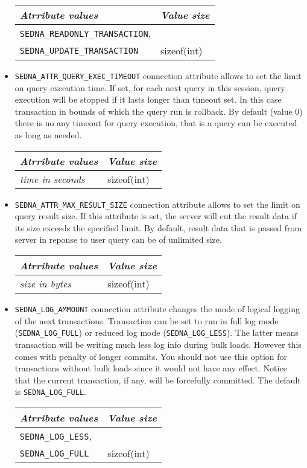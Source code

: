\documentclass[a4paper,12pt]{article}
\begin{document}
\begin{itemize}
\begin{tabular}{|l|l|}
\hline
\emph{Atrribute values} & \emph{Value size} \\
\hline
\verb!SEDNA_READONLY_TRANSACTION!, & \\ 
\verb!SEDNA_UPDATE_TRANSACTION! & sizeof(int) \\
\hline
\end{tabular}

\item\verb!SEDNA_ATTR_QUERY_EXEC_TIMEOUT! connection attribute allows to set the
limit on query execution time. If set, for each next query in this session,
query execution will be stopped if it lasts longer than timeout set. In this
case transaction in bounds of which the query run is rollback. By default (value
0) there is no any timeout for query execution, that is a query can be executed
as long as needed.

\begin{tabular}{|l|l|}
\hline
\emph{Atrribute values} & \emph{Value size} \\
\hline
\emph{time in seconds} & sizeof(int) \\
\hline
\end{tabular}

\item\verb!SEDNA_ATTR_MAX_RESULT_SIZE! connection attribute allows to set the
limit on query result size. If this attribute is set, the server will cut the
result data if its size exceeds the specified limit. By default, result data
that is passed from server in reponse to user query can be of unlimited size.

\begin{tabular}{|l|l|}
\hline
\emph{Atrribute values} & \emph{Value size} \\
\hline
\emph{size in bytes} & sizeof(int) \\
\hline
\end{tabular}

\item\verb!SEDNA_LOG_AMMOUNT! connection attribute changes the mode of logical
logging of the next transactions. Transaction can be set to run in full log mode
(\verb!SEDNA_LOG_FULL!) or reduced log mode (\verb!SEDNA_LOG_LESS!). The latter
means transaction will be writing much less log info during bulk loads. However
this comes with penalty of longer commits. You should not use this option for
transactions without bulk loads since it would not have any effect. Notice that
the current transaction, if any, will be forcefully committed. The default is
\verb!SEDNA_LOG_FULL!.

\begin{tabular}{|l|l|}
\hline
\emph{Atrribute values} & \emph{Value size} \\
\hline
\verb!SEDNA_LOG_LESS!, & \\ 
\verb!SEDNA_LOG_FULL! & sizeof(int) \\
\hline
\end{tabular}
\end{itemize}
\end{document}
